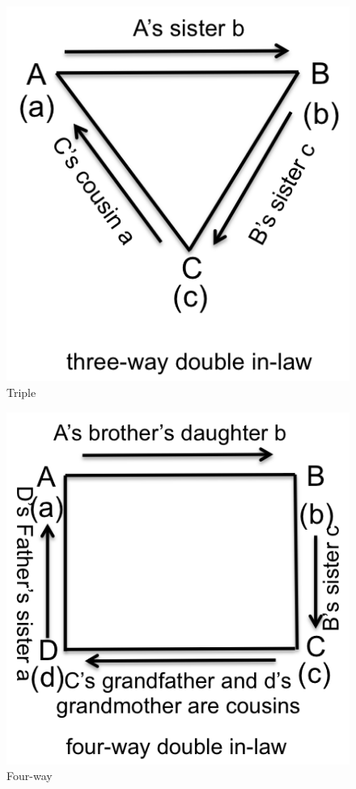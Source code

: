 \begin{figure}
\center
\includegraphics{figures/engagement/triple_3}
\caption{Triple
\label{figure:engage_3}}
\end{figure}

\begin{figure}
\center
\includegraphics{figures/engagement/four_4}
\caption{Four-way
\label{figure:engage_4}}
\end{figure}

